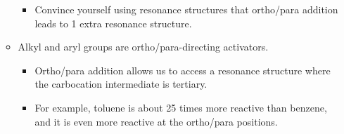 \documentclass[../notes.tex]{subfiles}
\begin{document}
\begin{itemize}
\begin{itemize}
        \begin{itemize}
            \item Convince yourself using resonance structures that ortho/para addition leads to 1 extra resonance structure.
        \end{itemize}
        \item Alkyl and aryl groups are ortho/para-directing activators.
        \begin{itemize}
            \item Ortho/para addition allows us to access a resonance structure where the carbocation intermediate is tertiary.
            \item For example, toluene is about 25 times more reactive than benzene, and it is even more reactive at the ortho/para positions.
        \end{itemize}
    \end{itemize}
\end{itemize}
\end{document}
